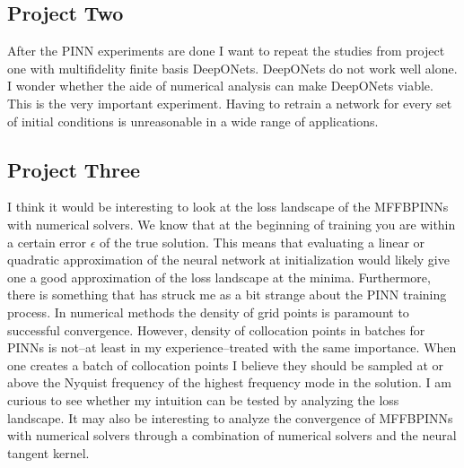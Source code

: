 \documentclass[12pt]{article}
\begin{document}
\subsection*{Project Two}
After the PINN experiments are done I want to repeat the studies from project one with multifidelity finite basis DeepONets. 
DeepONets do not work well alone. I wonder whether the aide of numerical analysis can make DeepONets viable. This is the 
very important experiment. Having to retrain a network for every set of initial conditions is unreasonable in a wide range of applications.
\subsection*{Project Three}
I think it would be interesting to look at the loss landscape of the MFFBPINNs with numerical solvers. We know that at 
the beginning of training you are within a certain error $\epsilon$ of the true solution. This means that evaluating a linear
or quadratic approximation of the neural network at initialization would likely give one a good approximation of the loss landscape at the minima. Furthermore, there is something that has struck me as a bit strange about the PINN training process.
In numerical methods the density of grid points is paramount to successful convergence. However, density of collocation points in batches for PINNs is not--at least in my experience--treated with the same importance. When one creates a batch of collocation points 
I believe they should be sampled at or above the Nyquist frequency of the highest frequency mode in the solution. I am curious to see 
whether my intuition can be tested by analyzing the loss landscape. It may also be interesting to analyze the convergence of MFFBPINNs with
numerical solvers through a combination of numerical solvers and the neural tangent kernel.
\end{document}
